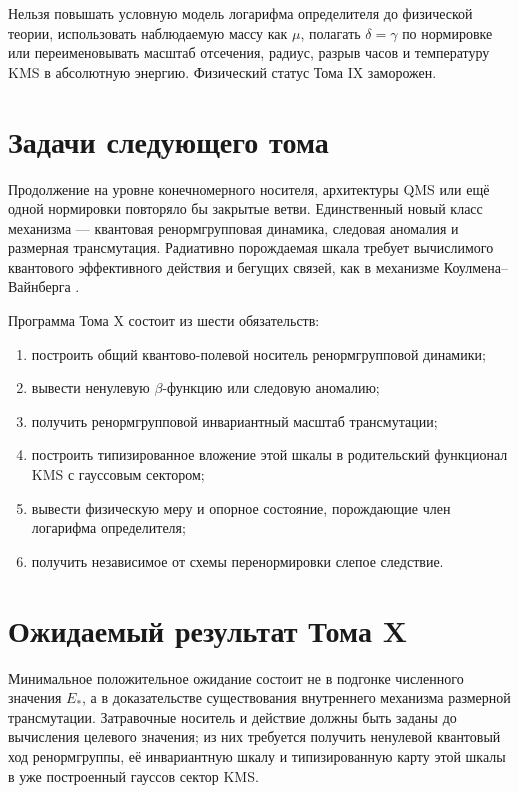 \begin{nogocriterion}
Нельзя повышать условную модель логарифма определителя до физической теории,
использовать наблюдаемую массу как $\mu$, полагать $\delta=\gamma$ по
нормировке или переименовывать масштаб отсечения, радиус, разрыв часов и
температуру KMS в абсолютную энергию. Физический статус Тома IX заморожен.
\end{nogocriterion}

\section{Задачи следующего тома}

Продолжение на уровне конечномерного носителя, архитектуры QMS или ещё одной
нормировки повторяло бы закрытые ветви. Единственный новый класс механизма
--- квантовая ренормгрупповая динамика, следовая аномалия и размерная
трансмутация. Радиативно порождаемая шкала требует вычислимого квантового
эффективного действия и бегущих связей, как в механизме Коулмена--Вайнберга
\cite{v9-final-coleman-weinberg1973}.

Программа Тома X состоит из шести обязательств:
\begin{enumerate}
\item построить общий квантово-полевой носитель ренормгрупповой динамики;
\item вывести ненулевую $\beta$-функцию или следовую аномалию;
\item получить ренормгрупповой инвариантный масштаб трансмутации;
\item построить типизированное вложение этой шкалы в родительский функционал
KMS с гауссовым сектором;
\item вывести физическую меру и опорное состояние, порождающие член
логарифма определителя;
\item получить независимое от схемы перенормировки слепое следствие.
\end{enumerate}

\section{Ожидаемый результат Тома X}

Минимальное положительное ожидание состоит не в подгонке численного значения
$E_*$, а в доказательстве существования внутреннего механизма размерной
трансмутации. Затравочные носитель и действие должны быть заданы до вычисления
целевого значения; из них требуется получить ненулевой квантовый ход
ренормгруппы, её инвариантную шкалу и типизированную карту этой шкалы в уже
построенный гауссов сектор KMS.

